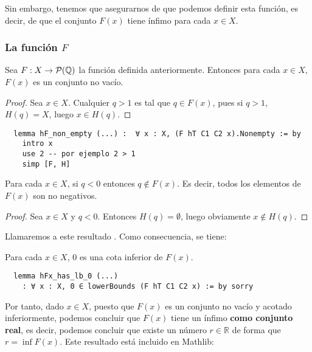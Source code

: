 Sin embargo, tenemos que asegurarnos de que podemos definir esta función, es decir, de que el conjunto $F(x)$ tiene ínfimo para cada $x \in X$.

\subsubsection{La función $F$}

\begin{lemma}
  Sea $F :  X  \to \mathcal{P}(\mathbb{Q})$ la función definida anteriormente. Entonces para cada $x \in X$, $F(x)$ es un conjunto no vacío.
\end{lemma}

\begin{proof}
  Sea $x \in X$. Cualquier $q > 1$ es tal que $q \in F(x)$, pues si $q >1$, $H(q) = X$, luego $x \in H(q)$.
\end{proof}

\begin{lstlisting}
  lemma hF_non_empty (...) :  ∀ x : X, (F hT C1 C2 x).Nonempty := by
    intro x
    use 2 -- por ejemplo 2 > 1
    simp [F, H]
\end{lstlisting}

\begin{lemma}
  Para cada $x \in X$, si $q < 0$ entonces $q \notin F(x)$. Es decir, todos los elementos de $F(x)$ son no negativos.
\end{lemma}

\begin{proof}
  Sea $x \in X$ y $q < 0$. Entonces $H(q) = \emptyset$, luego obviamente $x \notin H(q)$.
\end{proof}

Llamaremos a este resultado . Como consecuencia, se tiene:

\begin{lemma}
  Para cada $x \in X$, $0$ es una cota inferior de $F(x)$.
\end{lemma}

\begin{lstlisting}
  lemma hFx_has_lb_0 (...)
    : ∀ x : X, 0 ∈ lowerBounds (F hT C1 C2 x) := by sorry
\end{lstlisting}

Por tanto, dado $x \in X$, puesto que $F(x)$ es un conjunto no vacío y acotado inferiormente, podemos concluir que $F(x)$ tiene un ínfimo \textbf{como conjunto real}, es decir, podemos concluir que existe un número $r \in \mathbb{R}$ de forma que $r = \inf F(x)$. Este resultado está incluido en Mathlib:

